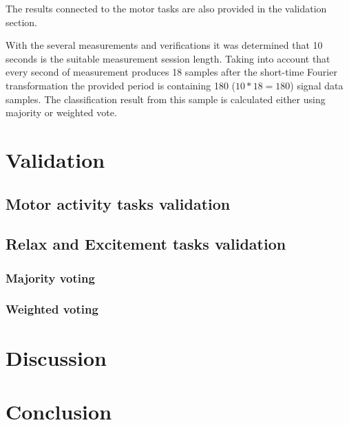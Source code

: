 \documentclass[12pt]{article}
\begin{document}
The results connected to the motor tasks are also provided in the validation section.

With the several measurements and verifications it was determined that 10 seconds is the suitable measurement session length. Taking into account that every second of measurement produces 18 samples after the short-time Fourier transformation the provided period is containing 180 ($10*18=180$) signal data samples. The classification result from this sample is calculated either using majority or weighted vote.
\newpage
\section{Validation}
\subsection{Motor activity tasks validation}

\subsection{Relax and Excitement tasks validation}
\subsubsection{Majority voting}
\subsubsection{Weighted voting}
\newpage
\section{Discussion}

\newpage
\section{Conclusion}
\end{document}
